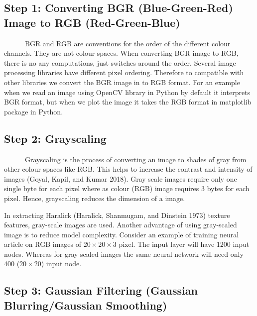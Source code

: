 \documentclass{article}
\begin{document}
\hypertarget{step-1-converting-bgr-blue-green-red-image-to-rgb-red-green-blue}{%
\subsection{Step 1: Converting BGR (Blue-Green-Red) Image to RGB
(Red-Green-Blue)}\label{step-1-converting-bgr-blue-green-red-image-to-rgb-red-green-blue}}

~~~~~~BGR and RGB are conventions for the order of the different colour
channels. They are not colour spaces. When converting BGR image to RGB,
there is no any computations, just switches around the order. Several
image processing libraries have different pixel ordering. Therefore to
compatible with other libraries we convert the BGR image in to RGB
format. For an example when we read an image using OpenCV library in
Python by default it interprets BGR format, but when we plot the image
it takes the RGB format in matplotlib package in Python.

\hypertarget{step-2-grayscaling}{%
\subsection{Step 2: Grayscaling}\label{step-2-grayscaling}}

~~~~~~Grayscaling is the process of converting an image to shades of
gray from other colour spaces like RGB. This helps to increase the
contrast and intensity of images (Goyal, Kapil, and Kumar 2018). Gray
scale images require only one single byte for each pixel where as colour
(RGB) image requires 3 bytes for each pixel. Hence, grayscaling reduces
the dimension of a image.

In extracting Haralick (Haralick, Shanmugam, and Dinstein 1973) texture
features, gray-scale images are used. Another advantage of using
gray-scaled image is to reduce model complexity. Consider an example of
training neural article on RGB images of \(20 \times 20 \times 3\)
pixel. The input layer will have 1200 input nodes. Whereas for gray
scaled images the same neural network will need only 400
(\(20 \times 20\)) input node.

\hypertarget{step-3-gaussian-filtering-gaussian-blurringgaussian-smoothing}{%
\subsection{Step 3: Gaussian Filtering (Gaussian Blurring/Gaussian
Smoothing)}\label{step-3-gaussian-filtering-gaussian-blurringgaussian-smoothing}}
\end{document}
